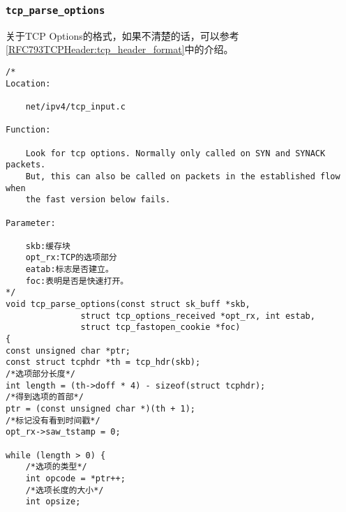 		\subsubsection{\texttt{tcp_parse_options}}
			\label{TCPOptions:tcp_parse_options}
				关于TCP Options的格式，如果不清楚的话，可以参考\ref{RFC793TCPHeader:tcp_header_format}中的介绍。
\begin{verbatim}
/* 
Location:

	net/ipv4/tcp_input.c

Function:

	Look for tcp options. Normally only called on SYN and SYNACK packets.
	But, this can also be called on packets in the established flow when
	the fast version below fails.

Parameter:

	skb:缓存块
	opt_rx:TCP的选项部分
	eatab:标志是否建立。
	foc:表明是否是快速打开。
*/
void tcp_parse_options(const struct sk_buff *skb,
		       struct tcp_options_received *opt_rx, int estab,
		       struct tcp_fastopen_cookie *foc)
{
const unsigned char *ptr;
const struct tcphdr *th = tcp_hdr(skb);
/*选项部分长度*/
int length = (th->doff * 4) - sizeof(struct tcphdr);
/*得到选项的首部*/
ptr = (const unsigned char *)(th + 1);
/*标记没有看到时间戳*/	
opt_rx->saw_tstamp = 0;

while (length > 0) {
	/*选项的类型*/
	int opcode = *ptr++;
	/*选项长度的大小*/		
	int opsize;


\end{verbatim}
